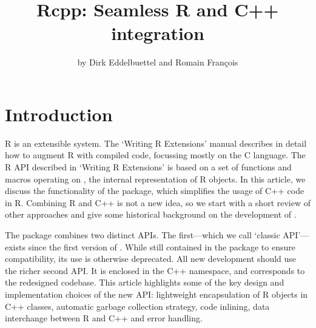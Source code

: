 
\title{Rcpp: Seamless R and C++ integration}
\author{by Dirk Eddelbuettel and Romain Fran\c{c}ois}

\maketitle


\section{Introduction} 

R is an extensible system. The `Writing R Extensions' manual \citep{R:exts}
describes in detail how to augment R with compiled code,
focussing mostly on the C language. The R API described in `Writing R Extensions' is
based on a set of functions and macros operating on , the internal
representation of R objects.
%
In this article, we discuss the functionality of the 
package, which simplifies the usage of C++ code
in R. Combining R and C++ is not a new idea, so we start with
a short review of other approaches and give some historical
background on the development of .

The  package combines two distinct
APIs. The first---which we call `classic  API'---exists since 
the first version of . While still contained in the package to
ensure compatibility, its use is otherwise deprecated. All new development should
use the richer second API. It is enclosed in the  C++ 
namespace, and corresponds to the redesigned codebase. 
This article highlights some of the key design and implementation choices of
the new API: lightweight encapsulation of R objects in C++ classes, automatic
garbage collection strategy, code inlining, data interchange between R and
C++ and error handling.

